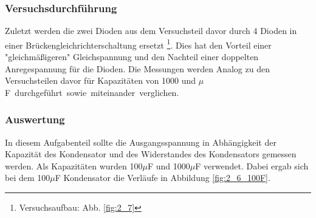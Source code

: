 \documentclass[12pt,a4paper]{article}
\begin{document}
\subsubsection{Versuchsdurchführung}
Zuletzt werden die zwei Dioden aus dem Versuchsteil davor durch 4 Dioden in einer Brückengleichrichterschaltung ersetzt \footnote{Versuchsaufbau: Abb. \ref{fig:2_7}}. Dies hat den Vorteil einer "gleichmäßigeren" Gleichspannung und den Nachteil einer doppelten Anregespannung für die Dioden. Die Messungen werden Analog zu den Versuchsteilen davor für Kapazitäten von 1000 und \unit[100]{$\mu$F} durchgeführt sowie miteinander verglichen.
\subsubsection{Auswertung}
In diesem Aufgabenteil sollte die Ausgangsspannung in Abhängigkeit der Kapazität des Kondensator und des Widerstandes des Kondensators gemessen werden. Als Kapazitäten wurden 100$\mu$F und 1000$\mu$F verwendet. Dabei ergab sich bei dem 100$\mu$F Kondensator die Verläufe in Abbildung \ref{fig:2_6_100F}.
\end{document}
